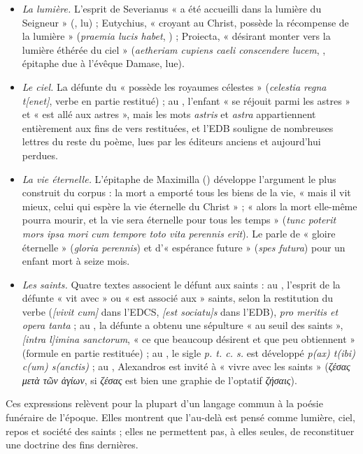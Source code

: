 \begin{itemize}
\item \emph{La lumière.} L’esprit de Severianus « a été accueilli dans la lumière du Seigneur » (, lu) ; Eutychius, « croyant au Christ, possède la récompense de la lumière » (\emph{praemia lucis habet}, ) ; Proiecta, « désirant monter vers la lumière éthérée du ciel » (\emph{aetheriam cupiens caeli conscendere lucem}, , épitaphe due à l’évêque Damase, lue).
\item \emph{Le ciel.} La défunte du  « possède les royaumes célestes » (\emph{celestia regna t[enet]}, verbe en partie restitué) ; au , l’enfant « se réjouit parmi les astres » et « est allé aux astres », mais les mots \emph{astris} et \emph{astra} appartiennent entièrement aux fins de vers restituées, et l’EDB souligne de nombreuses lettres du reste du poème, lues par les éditeurs anciens et aujourd’hui perdues.
\item \emph{La vie éternelle.} L’épitaphe de Maximilla () développe l’argument le plus construit du corpus : la mort a emporté tous les biens de la vie, « mais il vit mieux, celui qui espère la vie éternelle du Christ » ; « alors la mort elle-même pourra mourir, et la vie sera éternelle pour tous les temps » (\emph{tunc poterit mors ipsa mori cum tempore toto vita perennis erit}). Le  parle de « gloire éternelle » (\emph{gloria perennis}) et d’« espérance future » (\emph{spes futura}) pour un enfant mort à seize mois.
\item \emph{Les saints.} Quatre textes associent le défunt aux saints : au , l’esprit de la défunte « vit avec » ou « est associé aux » saints, selon la restitution du verbe (\emph{[vivit cum]} dans l’EDCS, \emph{[est sociatu]s} dans l’EDB), \emph{pro meritis et opera tanta} ; au , la défunte a obtenu une sépulture « au seuil des saints », \emph{[intra l]imina sanctorum}, « ce que beaucoup désirent et que peu obtiennent » (formule en partie restituée) ; au , le sigle \emph{p. t. c. s.} est développé \emph{p(ax) t(ibi) c(um) s(anctis)} ; au , Alexandros est invité à « vivre avec les saints » (\emph{ζέσας μετὰ τῶν ἁγίων}, si \emph{ζέσας} est bien une graphie de l’optatif \emph{ζήσαις}).
\end{itemize}

Ces expressions relèvent pour la plupart d’un langage commun à la poésie funéraire de l’époque. Elles montrent que l’au-delà est pensé comme lumière, ciel, repos et société des saints ; elles ne permettent pas, à elles seules, de reconstituer une doctrine des fins dernières.

